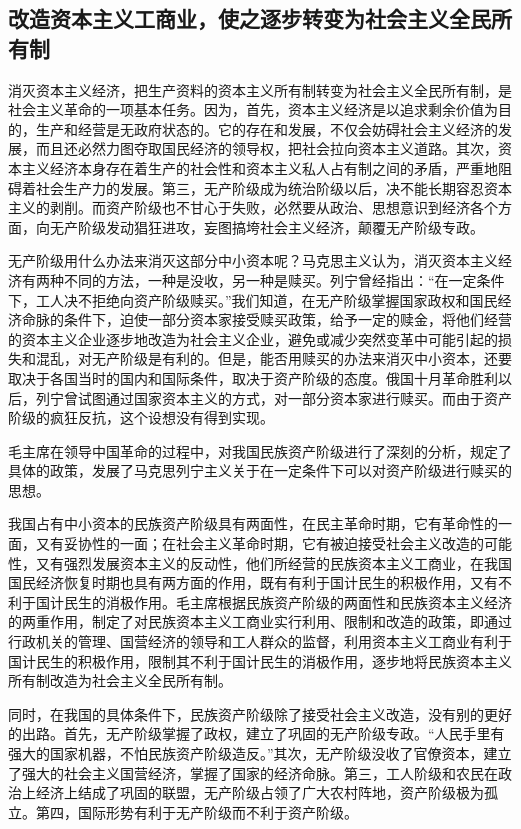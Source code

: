 \documentclass{book}
\begin{document}
\subsection{改造资本主义工商业，使之逐步转变为社会主义全民所有制}

消灭资本主义经济，把生产资料的资本主义所有制转变为社会主义全民所有制，是社会主义革命的一项基本任务。因为，首先，资本主义经济是以追求剩余价值为目的，生产和经营是无政府状态的。它的存在和发展，不仅会妨碍社会主义经济的发展，而且还必然力图夺取国民经济的领导权，把社会拉向资本主义道路。其次，资本主义经济本身存在着生产的社会性和资本主义私人占有制之间的矛盾，严重地阻碍着社会生产力的发展。第三，无产阶级成为统治阶级以后，决不能长期容忍资本主义的剥削。而资产阶级也不甘心于失败，必然要从政治、思想意识到经济各个方面，向无产阶级发动猖狂进攻，妄图搞垮社会主义经济，颠覆无产阶级专政。

无产阶级用什么办法来消灭这部分中小资本呢？马克思主义认为，消灭资本主义经济有两种不同的方法，一种是没收，另一种是赎买。列宁曾经指出：“在一定条件下，工人决不拒绝向资产阶级赎买。”我们知道，在无产阶级掌握国家政权和国民经济命脉的条件下，迫使一部分资本家接受赎买政策，给予一定的赎金，将他们经营的资本主义企业逐步地改造为社会主义企业，避免或减少突然变革中可能引起的损失和混乱，对无产阶级是有利的。但是，能否用赎买的办法来消灭中小资本，还要取决于各国当时的国内和国际条件，取决于资产阶级的态度。俄国十月革命胜利以后，列宁曾试图通过国家资本主义的方式，对一部分资本家进行赎买。而由于资产阶级的疯狂反抗，这个设想没有得到实现。

毛主席在领导中国革命的过程中，对我国民族资产阶级进行了深刻的分析，规定了具体的政策，发展了马克思列宁主义关于在一定条件下可以对资产阶级进行赎买的思想。

我国占有中小资本的民族资产阶级具有两面性，在民主革命时期，它有革命性的一面，又有妥协性的一面；在社会主义革命时期，它有被迫接受社会主义改造的可能性，又有强烈发展资本主义的反动性，他们所经营的民族资本主义工商业，在我国国民经济恢复时期也具有两方面的作用，既有有利于国计民生的积极作用，又有不利于国计民生的消极作用。毛主席根据民族资产阶级的两面性和民族资本主义经济的两重作用，制定了对民族资本主义工商业实行利用、限制和改造的政策，即通过行政机关的管理、国营经济的领导和工人群众的监督，利用资本主义工商业有利于国计民生的积极作用，限制其不利于国计民生的消极作用，逐步地将民族资本主义所有制改造为社会主义全民所有制。

同时，在我国的具体条件下，民族资产阶级除了接受社会主义改造，没有别的更好的出路。首先，无产阶级掌握了政权，建立了巩固的无产阶级专政。“人民手里有强大的国家机器，不怕民族资产阶级造反。”其次，无产阶级没收了官僚资本，建立了强大的社会主义国营经济，掌握了国家的经济命脉。第三，工人阶级和农民在政治上经济上结成了巩固的联盟，无产阶级占领了广大农村阵地，资产阶级极为孤立。第四，国际形势有利于无产阶级而不利于资产阶级。
\end{document}
